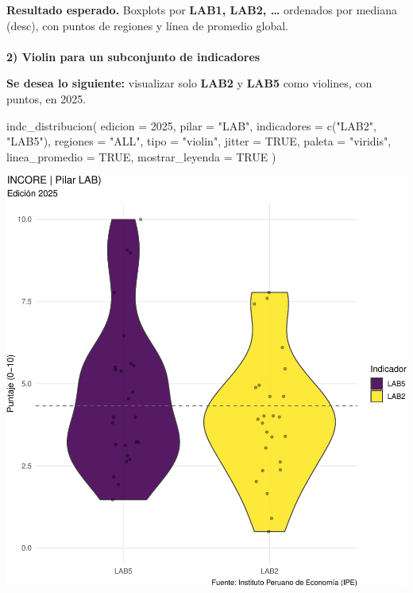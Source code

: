 \documentclass[
  11pt,
  letterpaper,
  DIV=11,
  numbers=noendperiod]{scrartcl}
\makeatletter
\let\oldparagraph\paragraph
\renewcommand{\paragraph}{
    \@ifstar
      \xxxParagraphStar
      \xxxParagraphNoStar
  }
\newcommand{\xxxParagraphStar}[1]{\oldparagraph*{#1}\mbox{}}
\newcommand{\xxxParagraphNoStar}[1]{\oldparagraph{#1}\mbox{}}
\newenvironment{Shaded}{\begin{snugshade}}{\end{snugshade}}
\newcommand{\AttributeTok}[1]{\textcolor[rgb]{0.40,0.45,0.13}{#1}}
\newcommand{\ConstantTok}[1]{\textcolor[rgb]{0.56,0.35,0.01}{#1}}
\newcommand{\DecValTok}[1]{\textcolor[rgb]{0.68,0.00,0.00}{#1}}
\newcommand{\FunctionTok}[1]{\textcolor[rgb]{0.28,0.35,0.67}{#1}}
\newcommand{\NormalTok}[1]{\textcolor[rgb]{0.00,0.23,0.31}{#1}}
\newcommand{\StringTok}[1]{\textcolor[rgb]{0.13,0.47,0.30}{#1}}
\makeatother
\begin{document}
\textbf{Resultado esperado.} Boxplots por \textbf{LAB1, LAB2, \ldots{}}
ordenados por mediana (desc), con puntos de regiones y línea de promedio
global.

\paragraph{\texorpdfstring{\textbf{2) Violin para un subconjunto de
indicadores}}{2) Violin para un subconjunto de indicadores}}\label{violin-para-un-subconjunto-de-indicadores}

\textbf{Se desea lo siguiente:} visualizar solo \textbf{LAB2} y
\textbf{LAB5} como violines, con puntos, en 2025.

\begin{Shaded}
\begin{Highlighting}[]
\FunctionTok{indc\_distribucion}\NormalTok{(}
  \AttributeTok{edicion         =} \DecValTok{2025}\NormalTok{,}
  \AttributeTok{pilar           =} \StringTok{"LAB"}\NormalTok{,}
  \AttributeTok{indicadores     =} \FunctionTok{c}\NormalTok{(}\StringTok{"LAB2"}\NormalTok{, }\StringTok{"LAB5"}\NormalTok{),}
  \AttributeTok{regiones        =} \StringTok{"ALL"}\NormalTok{,}
  \AttributeTok{tipo            =} \StringTok{"violin"}\NormalTok{,}
  \AttributeTok{jitter          =} \ConstantTok{TRUE}\NormalTok{,}
  \AttributeTok{paleta          =} \StringTok{"viridis"}\NormalTok{,}
  \AttributeTok{linea\_promedio  =} \ConstantTok{TRUE}\NormalTok{,}
  \AttributeTok{mostrar\_leyenda =} \ConstantTok{TRUE}
\NormalTok{)}
\end{Highlighting}
\end{Shaded}

\includegraphics{Manual_files/figure-pdf/unnamed-chunk-92-1.pdf}
\end{document}
